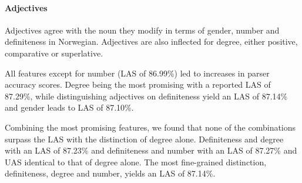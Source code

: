 \documentclass[11pt,a4paper]{article}
\begin{document}
\paragraph{Adjectives}
Adjectives agree with the noun they modify in terms of gender, number and
definiteness in Norwegian. Adjectives are also inflected for degree, either
positive, comparative or superlative.

All features except for number (LAS of 86.99\%) led to increases in parser
accuracy scores. Degree being the most promising with a reported LAS of
87.29\%, while distinguishing adjectives on definiteness yield an LAS of
87.14\% and gender leads to LAS of 87.10\%.

Combining the most promising features, we found that none of the combinations
surpass the LAS with the distinction of degree alone. Definiteness and degree
with an LAS of 87.23\% and definiteness and number with an LAS of 87.27\% and
UAS identical to that of degree alone. The most fine-grained distinction,
definiteness, degree and number, yields an LAS of 87.14\%.

\end{document}

